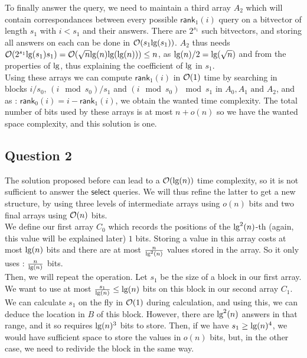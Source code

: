 \documentclass{cours}
\begin{document}
To finally answer the query, we need to maintain a third array $A_{2}$ which will contain correspondances between every possible $\textsf{rank}_{1}(i)$ query on a bitvector of length $s_{1}$ with $i < s_{1}$ and their answers. There are $2^{s_{1}}$ such bitvectors, and storing all answers on each can be done in $\mathcal{O}(s_{1} \textmd{lg}(s_{1}))$. $A_{2}$ thus needs $\mathcal{O}(2^{s_{1}}\textmd{lg}(s_{1})s_{1}) = \mathcal{O}(\sqrt{n}\textmd{lg}(n)\textmd{lg}{\left(\textmd{lg}(n)\right)}) \leq n$, as $\textmd{lg}(n)/2 = \textmd{lg}(\sqrt{n})$ and from the properties of $\textmd{lg}$, thus explaining the coefficient of $\textmd{lg}$ in $s_{1}$. \\

Using these arrays we can compute $\textsf{rank}_{1}(i)$ in $\mathcal{O}(1)$ time by searching in blocks $i/s_{0}$, $(i \mod s_{0})/s_{1}$ and $(i \mod s_{0}) \mod s_{1}$ in $A_{0}, A_{1} \text{ and } A_{2}$, and as : $\textsf{rank}_{0}(i) = i - \textsf{rank}_{1}(i)$, we obtain the wanted time complexity. The total number of bits used by these arrays is at most $n + o(n)$ so we have the wanted space complexity, and this solution is one. 

\subsection{Question 2}
The solution proposed before can lead to a $\mathcal{O}(\textmd{lg}(n))$ time complexity, so it is not sufficient to answer the $\textsf{select}$ queries. We will thus refine the latter to get a new structure, by using three levels of intermediate arrays using $o(n)$ bits and two final arrays using $\mathcal{O}(n)$ bits.\\

We define our first array $C_{0}$ which records the positions of the $\textmd{lg}^{2}(n)$-th (again, this value will be explained later) $1$ bits. Storing a value in this array costs at most $\textmd{lg}(n)$ bits and there are at most $\frac{n}{\textmd{lg}^{2}(n)}$ values stored in the array. So it only uses : $\frac{n}{\textmd{lg}(n)}$ bits.\\

Then, we will repeat the operation. Let $s_{1}$ be the size of a block in our first array. We want to use at most $\frac{s_{1}}{\textmd{lg}(n)} \leq \textmd{lg}(n)$ bits on this block in our second array $C_{1}$. We can calculate $s_{1}$ on the fly in $\mathcal{O}(1)$ during calculation, and using this, we can deduce the location in $B$ of this block.
However, there are $\textmd{lg}^{2}(n) $ answers in that range, and it so requires $\textmd{lg}(n)^{3} $ bits to store. 
Then, if we have $s_{1} \geq \textmd{lg}(n)^{4}$, we would have sufficient space to store the values in $o(n)$ bits, but, in the other case, we need to redivide the block in the same way.\\
\end{document}
